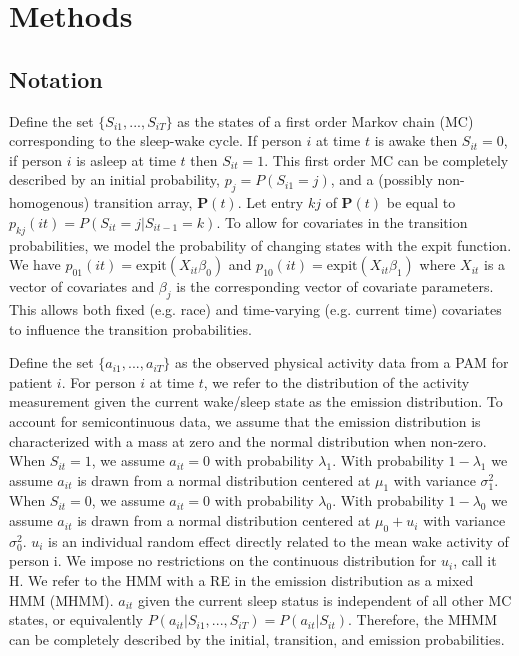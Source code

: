 \documentclass{article}
\begin{document}
\section{Methods} \label{Methods}
\subsection{Notation}

Define the set $\{S_{i1}, ..., S_{iT}\}$ as the states of a first order Markov chain (MC) corresponding to the sleep-wake cycle. If person $i$ at time $t$ is awake then $S_{it}=0$, if person $i$ is asleep at time $t$ then $S_{it}=1$. This first order MC can be completely described by an initial probability, $p_j=P(S_{i1} =j)$, and a (possibly non-homogenous) transition array, $\mathbf{P}(t)$.  Let entry $kj$ of $\mathbf{P}(t)$ be equal to $p_{kj}(it)=P(S_{it}=j|S_{it-1}=k)$. To allow for covariates in the transition probabilities, we model the probability of changing states with the expit function. We have $p_{01}(it) = \text{expit}(X_{it}\beta_0)$ and $p_{10}(it) = \text{expit}(X_{it}\beta_1)$ where $X_{it}$ is a vector of covariates and $\beta_j$ is the corresponding vector of covariate parameters. This allows both fixed (e.g. race) and time-varying (e.g. current time) covariates to influence the transition probabilities.

Define the set $\{a_{i1}, ..., a_{iT}\}$ as the observed physical activity data from a PAM for patient $i$. For person $i$ at time $t$, we refer to the distribution of the activity measurement given the current wake/sleep state as the emission distribution. To account for semicontinuous data, we assume that the emission distribution is characterized with a mass at zero and the normal distribution when non-zero. When $S_{it}=1$, we assume $a_{it} = 0$ with probability $\lambda_1$. With probability $1-\lambda_1$ we assume $a_{it}$ is drawn from a normal distribution centered at $\mu_1$ with variance $\sigma_1^2$. When $S_{it}=0$, we assume $a_{it} = 0$ with probability $\lambda_0$. With probability $1 - \lambda_0$ we assume $a_{it}$ is drawn from a normal distribution centered at $\mu_0+u_i$ with variance $\sigma_0^2$. $u_i$ is an individual random effect directly related to the mean wake activity of person i. We impose no restrictions on the continuous distribution for $u_i$, call it H. We refer to the HMM with a RE in the emission distribution as a mixed HMM (MHMM). $a_{it}$ given the current sleep status is independent of all other MC states, or equivalently $P(a_{it}|S_{i1}, ..., S_{iT}) = P(a_{it}|S_{it})$. Therefore, the MHMM can be completely described by the initial, transition, and emission probabilities.
 
\end{document}
